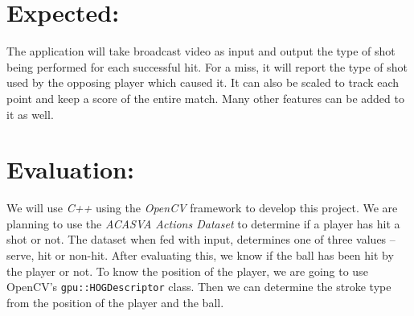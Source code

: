 \documentclass[10.5pt]{article}
\begin{document}
    \section{Expected:}
    The application will take broadcast video as input and output the type of shot being performed for each successful hit. For a miss, it will report the type of shot used by the opposing player which caused it. It can also be scaled to track each point and keep a score of the entire match. Many other features can be added to it as well.
    
    \section{Evaluation:}
    We will use \textit{C++} using the \textit{OpenCV} framework to develop this project. We are planning to use the \textit{ACASVA Actions Dataset}\cite{acasva} to determine if a player has hit a shot or not. The dataset when fed with input, determines one of three values -- serve, hit or non-hit. After evaluating this, we know if the ball has been hit by the player or not. To know the position of the player, we are going to use OpenCV's \texttt{gpu::HOGDescriptor}\cite{hog} class. Then we can determine the stroke type from the position of the player and the ball.
\end{document}
